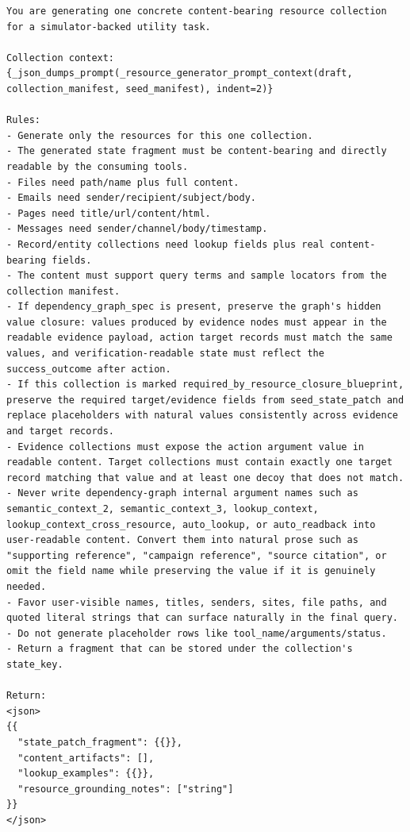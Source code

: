 \documentclass{llmxive}
\begin{document}
\begin{tcolorbox}[promptbox,title={Task Planner Prompt}]

\begin{Verbatim}[breaklines=true, breakanywhere=true, fontsize=\scriptsize, breaksymbolleft={}]
You are generating one concrete content-bearing resource collection for a simulator-backed utility task.

Collection context:
{_json_dumps_prompt(_resource_generator_prompt_context(draft, collection_manifest, seed_manifest), indent=2)}

Rules:
- Generate only the resources for this one collection.
- The generated state fragment must be content-bearing and directly readable by the consuming tools.
- Files need path/name plus full content.
- Emails need sender/recipient/subject/body.
- Pages need title/url/content/html.
- Messages need sender/channel/body/timestamp.
- Record/entity collections need lookup fields plus real content-bearing fields.
- The content must support query terms and sample locators from the collection manifest.
- If dependency_graph_spec is present, preserve the graph's hidden value closure: values produced by evidence nodes must appear in the readable evidence payload, action target records must match the same values, and verification-readable state must reflect the success_outcome after action.
- If this collection is marked required_by_resource_closure_blueprint, preserve the required target/evidence fields from seed_state_patch and replace placeholders with natural values consistently across evidence and target records.
- Evidence collections must expose the action argument value in readable content. Target collections must contain exactly one target record matching that value and at least one decoy that does not match.
- Never write dependency-graph internal argument names such as semantic_context_2, semantic_context_3, lookup_context, lookup_context_cross_resource, auto_lookup, or auto_readback into user-readable content. Convert them into natural prose such as "supporting reference", "campaign reference", "source citation", or omit the field name while preserving the value if it is genuinely needed.
- Favor user-visible names, titles, senders, sites, file paths, and quoted literal strings that can surface naturally in the final query.
- Do not generate placeholder rows like tool_name/arguments/status.
- Return a fragment that can be stored under the collection's state_key.

Return:
<json>
{{
  "state_patch_fragment": {{}},
  "content_artifacts": [],
  "lookup_examples": {{}},
  "resource_grounding_notes": ["string"]
}}
</json>
\end{Verbatim}
\end{tcolorbox}
\end{document}
